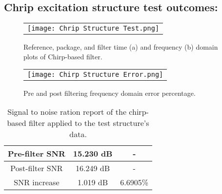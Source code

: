 \documentclass[]{spie}  %
\begin{document}
	\subsection{Chrip excitation structure test outcomes:}
	
	\begin{figure} [H]
		\begin{center}
			\begin{tabular}{c} 
				\texttt{[image: Chrip Structure Test.png]}
				
			\end{tabular}
		\end{center}
		\caption[example] 
		{ \label{fig:Chrip Structure Test} 
			Reference, package, and filter time (a) and frequency (b) domain plots of Chirp-based filter. }
	\end{figure} 
	
	\begin{figure} [H]
		\begin{center}
			\begin{tabular}{c} 
				\texttt{[image: Chirp Structure Error.png]}
			\end{tabular}
		\end{center}
		\caption[example] 
		{ \label{fig:chirp structure error} 
			Pre and post filtering frequency domain error percentage. }
	\end{figure} 

	\begin{table}[H]
	\caption{Signal to noise ration report of the chirp-based filter applied to the test structure’s data.} 
	\label{tab:SNR Report}
	\begin{center}       
		\begin{tabular}{|c|c|c|} 
			\hline
			\rule[-1ex]{0pt}{3.5ex}  Pre-filter SNR & 15.230 dB & - \\
			\hline
			\rule[-1ex]{0pt}{3.5ex}  Post-filter SNR & 16.249 dB & - \\
			\hline
			\rule[-1ex]{0pt}{3.5ex}  SNR increase & 1.019 dB & 6.6905\% \\
			\hline
		\end{tabular}
	\end{center}
	\end{table}
	
\end{document}
